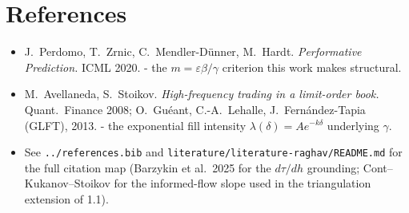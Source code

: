 \documentclass[11pt]{article}
\newcommand{\eps}{\varepsilon}
\newcommand{\code}[1]{\texttt{#1}}
\begin{document}
\section*{References}
\begin{itemize}[leftmargin=*]
\item J.\ Perdomo, T.\ Zrnic, C.\ Mendler-D\"unner, M.\ Hardt.
  \emph{Performative Prediction.} ICML 2020. - the $m=\eps\beta/\gamma$
  criterion this work makes structural.
\item M.\ Avellaneda, S.\ Stoikov. \emph{High-frequency trading in a limit-order
  book.} Quant.\ Finance 2008; O.\ Gu\'eant, C.-A.\ Lehalle, J.\
  Fern\'andez-Tapia (GLFT), 2013. - the exponential fill intensity
  $\lambda(\delta)=A e^{-k\delta}$ underlying $\gamma$.
\item See \code{../references.bib} and \code{literature/literature-raghav/README.md}
  for the full citation map (Barzykin et al.\ 2025 for the $d\tau/dh$ grounding;
  Cont--Kukanov--Stoikov for the informed-flow slope used in the triangulation
  extension of 1.1).
\end{itemize}
\end{document}
